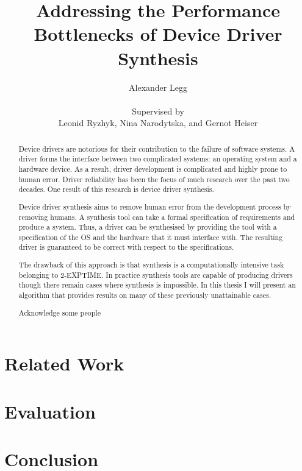 \documentclass[a4paper, twoside, openright, 11pt, oldfontcommands]{memoir}
\title{Addressing the Performance Bottlenecks of Device Driver Synthesis}
\author{Alexander Legg \\
    \\
    Supervised by \\
Leonid Ryzhyk, Nina Narodytska, and Gernot Heiser}
\begin{document}
\maketitle

\setcounter{secnumdepth}{3}
\setcounter{tocdepth}{3}
\tableofcontents

\begin{abstract}

Device drivers are notorious for their contribution to the failure of software
systems. A driver forms the interface between two complicated systems: an
operating system and a hardware device. As a result, driver development is
complicated and highly prone to human error. Driver reliability has been the
focus of much research over the past two decades. One result of this research
is device driver synthesis.

Device driver synthesis aims to remove human error from the development process
by removing humans. A synthesis tool can take a formal specification of
requirements and produce a system. Thus, a driver can be synthesised by
providing the tool with a specification of the OS and the hardware that it must
interface with. The resulting driver is guaranteed to be correct with respect
to the specifications.

The drawback of this approach is that synthesis is a computationally intensive
task belonging to 2-EXPTIME. In practice synthesis tools are capable of
producing drivers though there remain cases where synthesis is impossible. In
this thesis I will present an algorithm that provides results on many of these
previously unattainable cases.

\end{abstract}

\renewcommand{\abstractname}{Acknowledgements}
\begin{abstract}
Acknowledge some people
\end{abstract}





\chapter{Related Work}
\label{ch:relatedwork}







\chapter{Evaluation}

\chapter{Conclusion}



\end{document}
